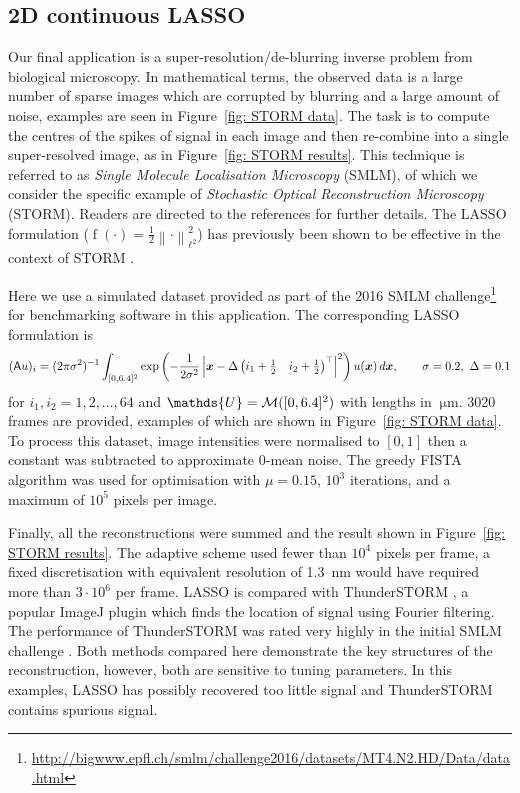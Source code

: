 \documentclass[smallextended]{svjour3}
\let\F\mathds\let\C\mathcal\newcommand{\R}{\F{R}}\newcommand{\A}{\tens{A}}
\newcommand{\norm}[1]{{\left\lVert #1 \right\rVert}}
\newcommand{\op}[1]{\operatorname{#1}}
\newcommand{\1}{\F{1}}
\newcommand*{\varf}[1]{%
	\IfEqCase{#1}{%
		{0}{u}%
		{1}{v}%
		{2}{w}%
	}[u#1]%
}
\newcommand*{\spcf}[1]{%
	\IfEqCase{#1}{%
		{0}{\F{U}}%
		{1}{\F{V}}%
		{2}{\F{W}}%
	}[\F{U}#1]%
}
\newcommand*{\varx}[1]{%
	\IfEqCase{#1}{%
		{0}{x}%
		{1}{y}%
		{2}{z}%
		{3}{r}%
	}[x#1]%
}
\newcommand*{\vvarx}[1]{\vec{\varx{#1}}}
\newcommand{\edit}[2]{{\ifmmode\text{\color{red}\sout{\ensuremath{#1}}}\else {\color{red} \sout{#1}}\fi} {\color{darkgreen} #2}}
\begin{document}
	\subsection{2D continuous LASSO}
	Our final application is a super-resolution/de-blurring inverse problem from biological microscopy. In mathematical terms, the observed data is a large number of sparse images which are corrupted by blurring and a large amount of noise, examples are seen in Figure~\ref{fig: STORM data}. The task is to compute the centres of the spikes of signal in each image and then re-combine into a single super-resolved image, as in Figure~\ref{fig: STORM results}. This technique is referred to as \emph{Single Molecule Localisation Microscopy} (SMLM), of which we consider the specific example of \emph{Stochastic Optical Reconstruction Microscopy} (STORM). Readers are directed to the references \cite{Sage2015,Sage2019,Schermelleh2019} for further details. The LASSO formulation \edit{}{($\op{f}(\cdot)=\frac12\norm{\cdot}_{\ell^2}^2$) }has previously been shown to be effective in the context of STORM \cite{Huang2017,Denoyelle2019}.
	
	Here we use a simulated dataset provided as part of the 2016 SMLM challenge\footnote{\url{http://bigwww.epfl.ch/smlm/challenge2016/datasets/MT4.N2.HD/Data/data.html}} for benchmarking software in this application. The corresponding LASSO formulation is 
	\begin{equation}
		(\A\varf0)_{i} = (2\pi\sigma^2)^{-1}\int_{[0,6.4]^2} \exp\left(-\frac{1}{2\sigma^2}\left|\vvarx0- \Delta\begin{pmatrix}i_1+\tfrac12 & i_2+\tfrac12\end{pmatrix}^\top \right|^2\right)\varf0(\vvarx0)\,d\vvarx0, \qquad \sigma=0.2,\ \Delta=0.1
	\end{equation}
	for $i_1,i_2 = 1,2,\ldots,64$ and $\spcf0=\C M([0,6.4]^2)$ with lengths in $\SI{}{\micro\meter}$. 3020 frames are provided, examples of which are shown in Figure~\ref{fig: STORM data}. To process this dataset, image intensities were normalised to $[0,1]$ then a constant was subtracted to approximate 0-mean noise. The greedy FISTA algorithm was used for optimisation with $\mu=0.15$, $10^3$ iterations, and a maximum of $10^5$ pixels per image. 
	
	Finally, all the reconstructions were summed and the result shown in Figure~\ref{fig: STORM results}. The adaptive scheme used fewer than $10^4$ pixels per frame, a fixed discretisation with equivalent resolution of \SI{1.3}{\nano\meter} would have required more than $3\cdot10^6$ per frame. LASSO is compared with ThunderSTORM \cite{Ovesny2014}, a popular ImageJ plugin \cite{Schindelin2012} which finds the location of signal using Fourier filtering. The performance of ThunderSTORM was rated very highly in the initial SMLM challenge \cite{Sage2015}. Both methods compared here demonstrate the key structures of the reconstruction, however, both are sensitive to tuning parameters. In this examples, LASSO has possibly recovered too little signal and ThunderSTORM contains spurious signal. 
	
\end{document}
